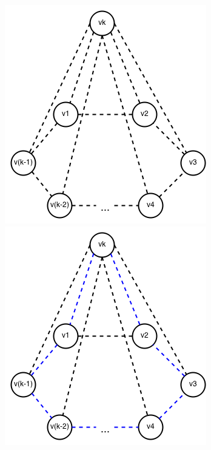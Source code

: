 \documentclass[russian]{article}
\begin{document}
\begin{figure}[H]
\begin{minipage}[t]{0.5\columnwidth}%
\begin{center}
\includegraphics[scale=0.45]{3_1}
\par\end{center}%
\end{minipage}\hfill{}%
\begin{minipage}[t]{0.5\columnwidth}%
\begin{center}
\includegraphics[scale=0.45]{3_2}
\par\end{center}%
\end{minipage}\linebreak{}
\end{figure}
\end{document}
